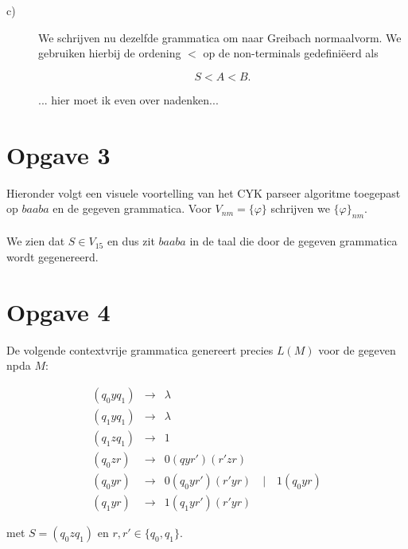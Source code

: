 \documentclass[a4paper,11pt]{article}
\begin{document}
\begin{description}
\item[c)]

We schrijven nu dezelfde grammatica om naar Greibach normaalvorm. We gebruiken
hierbij de ordening $<$ op de non-terminals gedefini\"eerd als

\begin{displaymath}
S < A < B \mbox{.}
\end{displaymath}

... hier moet ik even over nadenken...


\end{description}


\section*{Opgave 3}

Hieronder volgt een visuele voortelling van het CYK parseer algoritme
toegepast op $baaba$ en de gegeven grammatica. Voor $V_{nm}=\{\varphi\}$
schrijven we $\{\varphi\}_{nm}$.\\[1em]

\\[1em]

We zien dat $S \in V_{15}$ en dus zit $baaba$ in de taal die door de gegeven
grammatica wordt gegenereerd.


\section*{Opgave 4}

De volgende contextvrije grammatica genereert precies $L(M)$ voor de gegeven
npda $M$:

\begin{eqnarray*}
(q_{0}yq_{1}) & \rightarrow & \lambda \\
(q_{1}yq_{1}) & \rightarrow & \lambda \\
(q_{1}zq_{1}) & \rightarrow & 1 \\
(q_{0}zr) & \rightarrow & 0(qyr')(r'zr) \\
(q_{0}yr) & \rightarrow & 0(q_{0}yr')(r'yr) \quad | \quad 1(q_{0}yr) \\
(q_{1}yr) & \rightarrow & 1(q_{1}yr')(r'yr)
\end{eqnarray*}

met $S = (q_{0}zq_{1})$ en $r,r' \in \{q_{0},q_{1}\}$.
\end{document}
